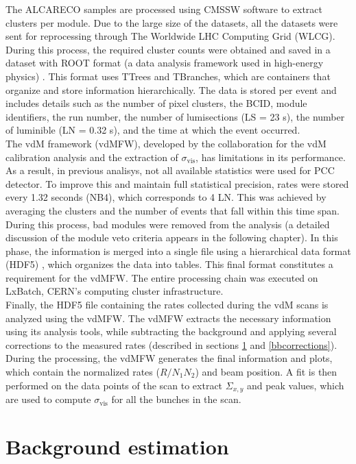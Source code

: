 The ALCARECO samples are processed using CMSSW software to extract clusters per module. Due to the large size of the datasets, all the datasets were sent for reprocessing through The Worldwide LHC Computing Grid (WLCG). During this process, the required cluster counts were obtained and saved in a dataset with ROOT format (a data analysis framework used in high-energy physics) \cite{ROOT}. This format uses TTrees and TBranches, which are containers that organize and store information hierarchically.  
The data is stored per event and includes details such as the number of pixel clusters, the BCID, module identifiers, the run number, the number of lumisections (LS = 23 s), the number of luminible (LN = 0.32 s), and the time at which the event occurred.
\\

The vdM framework (vdMFW), developed by the collaboration for the vdM calibration analysis and the extraction of \( \sigma_{\text{vis}} \), has limitations in its performance. As a result, in previous analisys, not all available statistics were used for PCC detector. To improve this and maintain full statistical precision, rates were stored every 1.32 seconds (NB4), which corresponds to 4 LN. This was achieved by averaging the clusters and the number of events that fall within this time span. During this process, bad modules were removed from the analysis (a detailed discussion of the module veto criteria appears in the following chapter). In this phase, the information is merged into a single file using a hierarchical data format (HDF5) \cite{HD5}, which organizes the data into tables. This final format constitutes a requirement for the vdMFW. The entire processing chain was executed on LxBatch, CERN's computing cluster infrastructure.\\

Finally, the HDF5 file containing the rates collected during the vdM scans is analyzed using the vdMFW. The vdMFW extracts the necessary information using its analysis tools, while subtracting the background and applying several corrections to the measured rates (described in sections \ref{bkg} and \ref{bbcorrections}). During the processing, the vdMFW generates the final information and plots, which contain the normalized rates ($R/N_{1}N_{2}$) and beam position. A fit is then performed on the data points of the scan to extract $\Sigma_{x,y}$ and peak values, which are used to compute $\sigma_{\text{vis}}$ for all the bunches in the scan.


\section{Background estimation}
\label{bkg}


